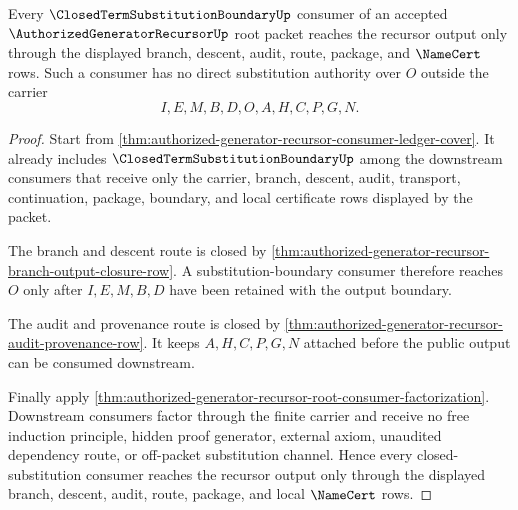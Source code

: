 \begin{theorem}
\label{thm:authorized-generator-recursor-closed-substitution-consumer-row}
Every $\ClosedTermSubstitutionBoundaryUp$ consumer of an accepted $\AuthorizedGeneratorRecursorUp$ root packet reaches the recursor output only through the displayed branch, descent, audit, route, package, and $\NameCert$ rows. Such a consumer has no direct substitution authority over $O$ outside the carrier
$$
I,E,M,B,D,O,A,H,C,P,G,N.
$$
\end{theorem}
\begin{proof}
Start from \autoref{thm:authorized-generator-recursor-consumer-ledger-cover}. It already includes $\ClosedTermSubstitutionBoundaryUp$ among the downstream consumers that receive only the carrier, branch, descent, audit, transport, continuation, package, boundary, and local certificate rows displayed by the packet.

The branch and descent route is closed by \autoref{thm:authorized-generator-recursor-branch-output-closure-row}. A substitution-boundary consumer therefore reaches $O$ only after $I,E,M,B,D$ have been retained with the output boundary.

The audit and provenance route is closed by \autoref{thm:authorized-generator-recursor-audit-provenance-row}. It keeps $A,H,C,P,G,N$ attached before the public output can be consumed downstream.

Finally apply \autoref{thm:authorized-generator-recursor-root-consumer-factorization}. Downstream consumers factor through the finite carrier and receive no free induction principle, hidden proof generator, external axiom, unaudited dependency route, or off-packet substitution channel. Hence every closed-substitution consumer reaches the recursor output only through the displayed branch, descent, audit, route, package, and local $\NameCert$ rows.
\end{proof}
